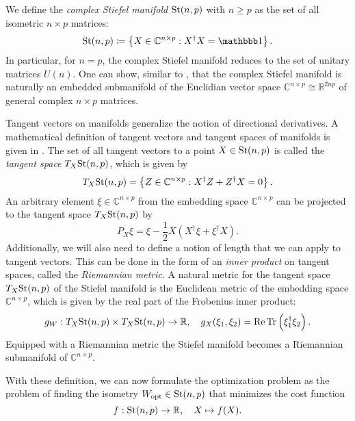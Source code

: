 We define the \textit{complex Stiefel manifold} $\text{St}(n,p)$ with $n \ge p$ as the set of all isometric $n\times p$ matrices:
\begin{equation}
	\label{eq:Stiefel_manifold_definition}
	\Stiefel \coloneqq \left\{X\in\mathbb{C}^{n\times p}: X^\dagger X = \id\right\}.
\end{equation}
In particular, for $n = p$, the complex Stiefel manifold reduces to the set of unitary matrices $U(n)$. One can show, similar to \cite{cite:optimization_on_matrix_manifolds}, that the complex Stiefel manifold is naturally an embedded submanifold of the Euclidian vector space $\mathbb{C}^{n\times p} \cong \mathbb{R}^{2np}$ of general complex $n\times p$ matrices. \par
Tangent vectors on manifolds generalize the notion of directional derivatives. A mathematical definition of tangent vectors and tangent spaces of manifolds is given in \cite{cite:optimization_on_matrix_manifolds}. The set of all tangent vectors to a point $X\in\text{St}(n,p)$ is called the \textit{tangent space} $T_X \text{St}(n,p)$, which is given by \cite{cite:optimization_on_matrix_manifolds, cite:riemannian_optimization_isometric_tensor_networks}
\begin{equation}
	\label{eq:Stiefel_manifold_tangent_space}
	T_X \text{St}(n,p) = \left\{Z\in\mathbb{C}^{n\times p}:X^\dagger Z + Z^\dagger X = 0\right\}.
\end{equation}
An arbitrary element $\xi \in \mathbb{C}^{n\times p}$ from the embedding space $\mathbb{C}^{n\times p}$ can be projected to the tangent space $T_X \text{St}(n,p)$ by \cite{cite:optimization_on_matrix_manifolds, cite:riemannian_optimization_isometric_tensor_networks}
\begin{equation}
	\label{eq:Stiefel_manifold_project_to_tangent_space}
	P_X\xi = \xi - \frac{1}{2}X\left(X^\dagger\xi + \xi^\dagger X\right).
\end{equation}
Additionally, we will also need to define a notion of length that we can apply to tangent vectors. This can be done in the form of an \textit{inner product} on tangent spaces, called the \textit{Riemannian metric}. A natural metric for the tangent space $T_X \text{St}(n,p)$ of the Stiefel manifold is the Euclidean metric of the embedding space $\mathbb{C}^{n\times p}$, which is given by the real part of the Frobenius inner product:
\begin{equation}
	\label{eq:Stiefel_manifold_riemannian_metric}
	g_W: T_X \text{St}(n,p) \times T_X \text{St}(n,p) \to \mathbb{R}, \quad g_X(\xi_1, \xi_2) = \operatorname{Re}\operatorname{Tr}\left(\xi_1^\dagger\xi_2\right).
\end{equation}
Equipped with a Riemannian metric the Stiefel manifold becomes a Riemannian submanifold of $\mathbb{C}^{n\times p}$. \par
With these definition, we can now formulate the optimization problem as the problem of finding the isometry $W_\text{opt} \in \text{St}(n,p)$ that minimizes the cost function
\begin{equation}
	\label{eq:Optimization_cost_function_definition}
	f: \text{St}(n,p) \to \mathbb{R}, \quad X \mapsto f(X).
\end{equation}